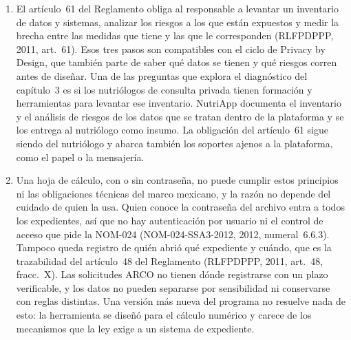 \documentclass[12pt, a4paper]{article}
\begin{document}
\begin{enumerate}[label=\Roman*.]
\begin{itemize}
    \item \textit{Visibilidad y transparencia} supone que el
    sistema opera como se prometió al titular y que eso puede
    comprobarse. Corresponde al deber de informar mediante el aviso
    de privacidad (art.~14), al contenido mínimo de ese aviso
    (art.~15) y al principio de información (LFPDPPP, 2025,
    art.~5).
 
    \item \textit{Respeto por el usuario} coloca al titular en el
    centro del diseño. Corresponde a los derechos ARCO (LFPDPPP,
    2025, arts.~22--34) y al plazo de veinte días para
    responder una solicitud (art.~31).
  \end{itemize}
 
  \item El artículo~61 del Reglamento obliga al responsable a
  levantar un inventario de datos y sistemas, analizar los riesgos
  a los que están expuestos y medir la brecha entre las medidas
  que tiene y las que le corresponden (RLFPDPPP, 2011, art.~61).
  Esos tres pasos son compatibles con el ciclo de Privacy by
  Design, que también parte de saber qué datos se tienen y qué
  riesgos corren antes de diseñar. Una de las preguntas que explora el
  diagnóstico del capítulo~3 es si los nutriólogos de consulta privada tienen
  formación y herramientas para levantar ese inventario. NutriApp
  documenta el inventario y el análisis de riesgos de los datos que se
  tratan dentro de la plataforma y se los entrega al nutriólogo como
  insumo. La obligación del artículo~61 sigue siendo del nutriólogo y
  abarca también los soportes ajenos a la plataforma, como el papel o la
  mensajería.
 
  \item Una hoja de cálculo, con o sin contraseña, no puede cumplir
  estos principios ni las obligaciones técnicas del marco mexicano,
  y la razón no depende del cuidado de quien la usa. Quien conoce
  la contraseña del archivo entra a todos los expedientes, así que
  no hay autenticación por usuario ni el control de acceso que pide
  la NOM-024 (NOM-024-SSA3-2012, 2012, numeral~6.6.3). Tampoco
  queda registro de quién abrió qué expediente y cuándo, que es la
  trazabilidad del artículo~48 del Reglamento (RLFPDPPP, 2011,
  art.~48, fracc.~X). Las solicitudes ARCO no tienen dónde
  registrarse con un plazo verificable, y los datos no pueden
  separarse por sensibilidad ni conservarse con reglas distintas.
  Una versión más nueva del programa no resuelve nada de esto: la
  herramienta se diseñó para el cálculo numérico y carece de los
  mecanismos que la ley exige a un sistema de expediente.
 
\end{enumerate}
\end{document}
